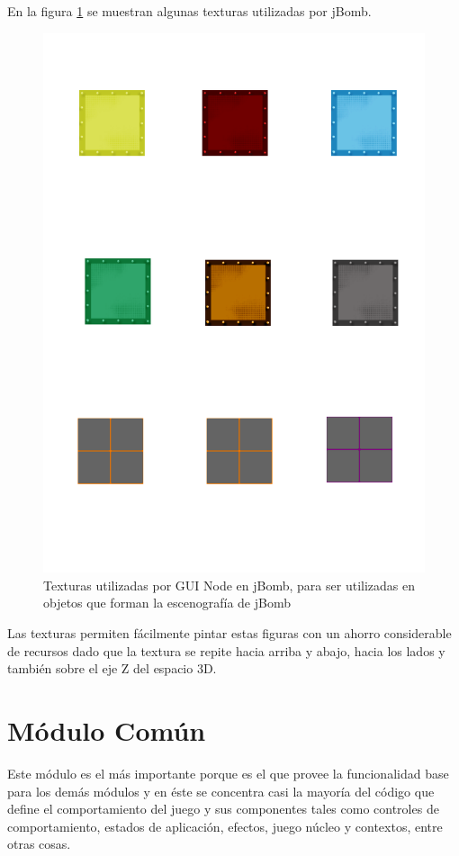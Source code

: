 \documentclass[a4paper,12pt,openany,oneside]{book}
\begin{document}
En la figura \ref{textureslabel} se muestran algunas texturas utilizadas por jBomb.
\begin{figure}
\begin{center}
\includegraphics[scale=0.7]{textures.pdf} 
\end{center}
\caption[Utilización de texturas en jBomb]{Texturas utilizadas por GUI Node en jBomb, para ser utilizadas en objetos que forman la escenografía de jBomb}\label{textureslabel}
\end{figure}

Las texturas permiten fácilmente pintar estas figuras con un ahorro considerable de recursos dado que la textura se repite hacia arriba y abajo, hacia los lados y también sobre el eje Z del espacio 3D.
\section{Módulo Común}
Este módulo es el más importante porque es el que provee la funcionalidad base para los demás módulos y en éste se concentra casi la mayoría del código que define el comportamiento del juego y sus componentes tales como controles de comportamiento, estados de aplicación, efectos, juego núcleo y contextos, entre otras cosas.
\end{document}
